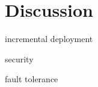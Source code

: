 \documentclass{sig-alternate-10pt}
\begin{document}
\begin{abstract}

\end{abstract}











\section{Discussion}
\label{sec:discussion}

incremental deployment

security

fault tolerance





\small



\end{document}

